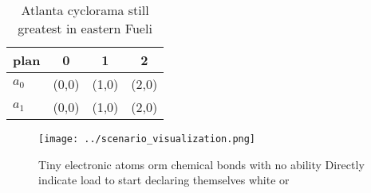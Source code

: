 \documentclass[a4paper]{article}
\begin{document}
\begin{table}
\begin{adjustbox}{width=0.6\columnwidth}
\begin{tabular}{|l|l|l|l|}
\hline
\textbf{plan} & \multicolumn{1}{c|}{\textbf{0}} & \multicolumn{1}{c|}{\textbf{1}} & \multicolumn{1}{c|}{\textbf{2}} \\ \hline
\textbf{$a_0$}  & (0,0) & (1,0) & (2,0) \\ \hline
\textbf{$a_1$}  & (0,0) & (1,0) & (2,0) \\ \hline
\end{tabular}
\end{adjustbox}
\caption{Atlanta cyclorama still greatest in eastern Fueli
}
\end{table}

\begin{figure}
\centering
\texttt{[image: ../scenario\_visualization.png]}
\caption{Tiny electronic atoms orm chemical bonds with no ability Directly indicate load to start declaring themselves white or 
}
\end{figure}
 
\end{document}
